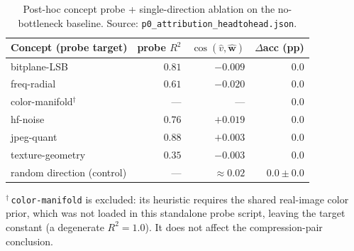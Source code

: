\begin{table}[h]
  \centering
  \caption{Post-hoc concept probe + single-direction ablation on the no-bottleneck baseline.
    Source: \texttt{p0\_attribution\_headtohead.json}.}
  \label{tab:probe}
  \small
  \begin{tabular}{lrrr}
    \toprule
    Concept (probe target) & probe $R^2$ & $\cos(\hat{v},\hat{\mathbf{w}})$ & $\Delta$acc (pp) \\
    \midrule
    bitplane-LSB     & $0.81$ & $-0.009$ & $0.0$ \\
    freq-radial      & $0.61$ & $-0.020$ & $0.0$ \\
    color-manifold$^{\dagger}$ & --- & --- & $0.0$ \\
    hf-noise         & $0.76$ & $+0.019$ & $0.0$ \\
    jpeg-quant       & $\mathbf{0.88}$ & $+0.003$ & $0.0$ \\
    texture-geometry & $0.35$ & $-0.003$ & $0.0$ \\
    \midrule
    random direction (control) & --- & ${\approx}0.02$ & $0.0\pm0.0$ \\
    \bottomrule
  \end{tabular}

  \vspace{2pt}
  {\footnotesize $^{\dagger}$\,\texttt{color-manifold} is excluded: its heuristic requires the
  shared real-image color prior, which was not loaded in this standalone probe script, leaving
  the target constant (a degenerate $R^2{=}1.0$). It does not affect the compression-pair
  conclusion.}
\end{table}
